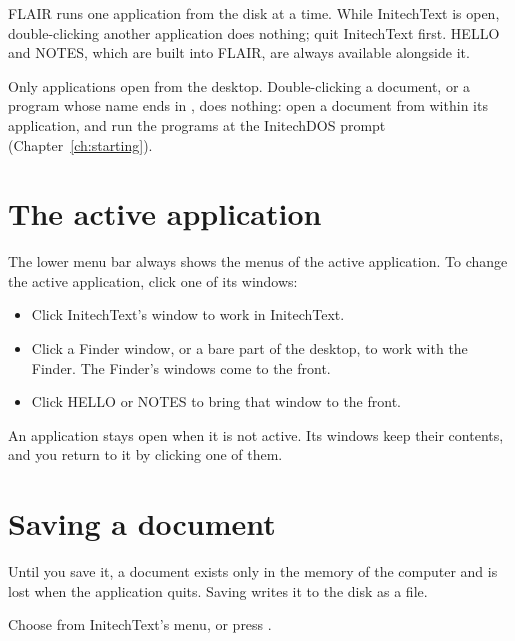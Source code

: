 
FLAIR runs one application from the disk at a time.  While InitechText is
open, double-clicking another application does nothing; quit InitechText
first.  HELLO and NOTES, which are built into FLAIR, are always available
alongside it.

Only applications open from the desktop.  Double-clicking a document, or a
program whose name ends in , does nothing: open a document from
within its application, and run the  programs at the InitechDOS
prompt (Chapter~\ref{ch:starting}).

\section{The active application}
The lower menu bar always shows the menus of the active application.  To
change the active application, click one of its windows:
\begin{itemize}
\item Click InitechText's window to work in InitechText.
\item Click a Finder window, or a bare part of the desktop, to work with
  the Finder.  The Finder's windows come to the front.
\item Click HELLO or NOTES to bring that window to the front.
\end{itemize}
An application stays open when it is not active.  Its windows keep their
contents, and you return to it by clicking one of them.

\section{Saving a document}
Until you save it, a document exists only in the memory of the computer and
is lost when the application quits.  Saving writes it to the disk as a
file.
\begin{TaskSteps}
\Step Choose  from InitechText's  menu, or
press .
\end{TaskSteps}


